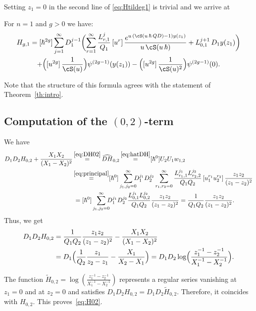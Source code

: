 Setting $z_1=0$ in the second line of \eqref{eq:Htildeg1} is trivial and we arrive at
\begin{proposition} For $n=1$ and $g>0$ we have:\vspace*{-3pt}
\begin{multline} \label{eq:(g,1)}
H_{g,1} =[\hbar^{2g}]\sum_{j=1}^\infty D_1^{j-1}\biggl(\sum_{r=1}^\infty\frac{L_{r,1}^j}{Q_1}
\,[u^r]\, \frac{e^{u\,(\cS(u\,\hbar\,Q D)-1)y(z_1)}}{u\,\cS(u\,\hbar)}+L_{0,1}^{j+1}\, D_1y(z_1)\biggr)
\\
+\Bigl([u^{2g}]\,\frac1{\cS(u)}\Bigr) \psi^{(2g-1)}(y(z_1))
-\Bigl([u^{2g}]\,\frac1{\cS(u)^2}\Bigr) \psi^{(2g-1)}(0).
\end{multline}
\end{proposition}

Note that the structure of this formula agrees with the statement of Theorem~\ref{th:intro}.

\subsection{Computation of the \texorpdfstring{$(0,2)$}{(0,2)}-term}

We have\vspace*{-3pt}
\begin{align*}
D_1D_2H_{0,2}+\frac{X_1X_2}{(X_1-X_2)^2}& \mathop{=}^{\eqref{eq:DH02}}\widehat{DH}_{0,2}
\mathop{=}^{\eqref{eq:hatDH}}[\hbar^0]U_2U_1w_{1,2}\\
&\mathop{=}^{\eqref{eq:principal}}
[\hbar^0]\sum_{j_1,j_2=0}^\infty \hspace*{-2mm}D_1^{j_1}D_2^{j_2}\sum_{r_1,r_2=0}^\infty
\frac{L_{r_1,1}^{j_1}L_{r_2,2}^{j_2}}{Q_1Q_2}
\,[u_1^{r_1}u_2^{r_2}]\,\frac{z_1z_2}{(z_1-z_2)^2}\\
&\,=[\hbar^0]\sum_{j_1,j_2=0}^\infty\hspace*{-2mm} D_1^{j_1}D_2^{j_2}
\frac{L_{0,1}^{j_1}L_{0,2}^{j_2}}{Q_1Q_2}
\frac{z_1z_2}{(z_1-z_2)^2}=\frac{1}{Q_1Q_2}\frac{z_1z_2}{(z_1-z_2)^2}.
\end{align*}
Thus, we get\vspace*{-3pt}
\begin{align*}
D_1D_2H_{0,2}&=\frac{1}{Q_1Q_2}\frac{z_1z_2}{(z_1-z_2)^2}-\frac{X_1X_2}{(X_1-X_2)^2}\\
&=D_1\Bigl(\frac{1}{Q_2}\frac{z_1}{z_2-z_1}-\frac{X_1}{X_2-X_1}\Bigr)=D_1D_2\log\Bigl(\frac {z_1^{-1}-z_2^{-1}}{X_1^{-1}-X_2^{-1}}\Bigr).
\end{align*}

The function $\widetilde H_{0,2}=\log\left(\frac {z_1^{-1}-z_2^{-1}}{X_1^{-1}-X_2^{-1}}\right)$ represents a regular series vanishing at $z_1=0$ and at $z_2=0$ and satisfies $D_1D_2H_{0,2}=D_1D_2\widetilde H_{0,2}$. Therefore, it coincides with $H_{0,2}$. This proves~\eqref{eq:H02}.


